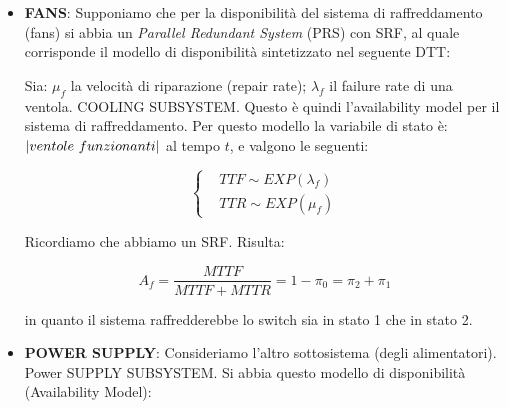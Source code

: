 \begin{itemize}

\item{\textbf{FANS}}: Supponiamo che per la disponibilità del sistema di raffreddamento (fans) si abbia un \textit{Parallel Redundant System} (PRS) con SRF, al quale corrisponde il modello di disponibilità sintetizzato nel seguente DTT:

\begin{center}
\end{center}

Sia: $\mu_f$ la velocità di riparazione (repair rate); $\lambda_f$ il failure rate di una ventola. COOLING SUBSYSTEM. Questo è quindi l'availability model per il sistema di raffreddamento. Per questo modello la variabile di stato è: $\left\vert{ventole\ funzionanti}\right\vert$ al tempo $t$, e valgono le seguenti:

\[
	\left\{
	\begin{aligned}
	&TTF \sim EXP(\lambda_f)\\
	&TTR \sim EXP(\mu_f)
	\end{aligned}
	\right.
\]

Ricordiamo che abbiamo un SRF. Risulta:

\[
	A_f = \frac{MTTF}{MTTF+MTTR} = 1-\pi_0 = \pi_2+\pi_1
\]

in quanto il sistema raffredderebbe lo switch sia in stato 1 che in stato 2.

\item{\textbf{POWER SUPPLY}}: Consideriamo l'altro sottosistema (degli alimentatori). Power SUPPLY SUBSYSTEM. Si abbia questo modello di disponibilità (Availability Model):

\begin{center}
\end{center}


\end{itemize}
